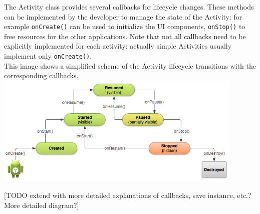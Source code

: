 \documentclass[11pt,a4paper,notitlepage]{article}
\begin{document}
The Activity class provides several callbacks for lifecycle changes. These methods can be implemented by the developer to manage the state of the Activity: for example \texttt{onCreate()} can be used to initialize the UI components, \texttt{onStop()} to free resources for the other applications. Note that not all callbacks need to be explicitly implemented for each activity: actually simple Activities usually implement only \texttt{onCreate()}.\bigskip \\

This image shows a simplified scheme of the Activity lifecycle transitions with the corresponding callbacks.
\includegraphics[width=450px]{Images/Android/basic-lifecycle.png}

[TODO extend with more detailed explanations of callbacks, save instance, etc.? More detailed diagram?]
\end{document}
